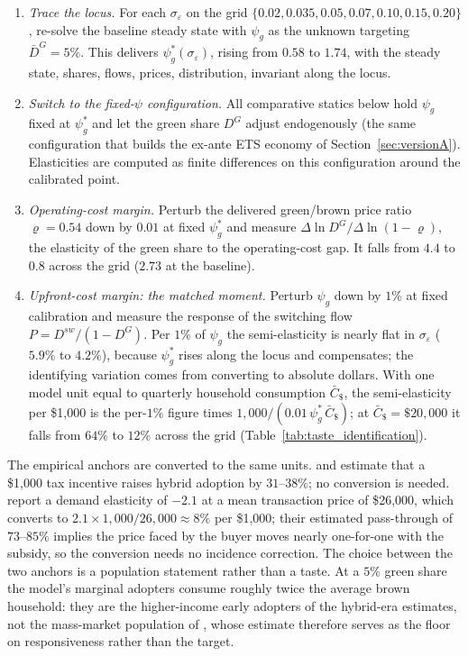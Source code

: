 \begin{enumerate}\itemsep3pt
\item \emph{Trace the locus.} For each $\sigma_\varepsilon$ on the grid
$\{0.02, 0.035, 0.05, 0.07, 0.10, 0.15, 0.20\}$, re-solve the baseline steady
state with $\psi_g$ as the unknown targeting $\bar D^G = 5\%$. This delivers
$\psi_g^*(\sigma_\varepsilon)$, rising from $0.58$ to $1.74$, with the steady
state, shares, flows, prices, distribution, invariant along the locus.

\item \emph{Switch to the fixed-$\psi$ configuration.} All comparative statics
below hold $\psi_g$ fixed at $\psi_g^*$ and let the green share $D^G$ adjust
endogenously (the same configuration that builds the ex-ante ETS economy of
Section~\ref{sec:versionA}). Elasticities are computed as finite differences on
this configuration around the calibrated point.

\item \emph{Operating-cost margin.} Perturb the delivered green/brown price
ratio $\varrho = 0.54$ down by $0.01$ at fixed $\psi_g^*$ and measure
$\Delta \ln D^G / \Delta \ln (1-\varrho)$, the elasticity of the green share to
the operating-cost gap. It falls from $4.4$ to $0.8$ across the grid ($2.73$ at
the baseline).

\item \emph{Upfront-cost margin: the matched moment.} Perturb $\psi_g$ down by
$1\%$ at fixed calibration and measure the response of the switching flow
$P = D^{sw}/(1-D^G)$. Per $1\%$ of $\psi_g$ the semi-elasticity is nearly flat
in $\sigma_\varepsilon$ ($5.9\%$ to $4.2\%$), because $\psi_g^*$ rises along the
locus and compensates; the identifying variation comes from converting to
absolute dollars. With one model unit equal to quarterly household consumption
$\bar C_{\$}$, the semi-elasticity per \$1{,}000 is the per-$1\%$ figure times
$1{,}000/(0.01\,\psi_g^*\,\bar C_{\$})$; at $\bar C_{\$} = \$20{,}000$ it falls
from $64\%$ to $12\%$ across the grid
(Table~\ref{tab:taste_identification}).
\end{enumerate}

The empirical anchors are converted to the same units.
\citet{GallagherMuehlegger2011} and \citet{Chandra2010} estimate that a
\$1{,}000 tax incentive raises hybrid adoption by $31$--$38\%$; no conversion is
needed. \citet{MuehleggerRapson2022} report a demand elasticity of $-2.1$ at a
mean transaction price of \$26{,}000, which converts to
$2.1 \times 1{,}000/26{,}000 \approx 8\%$ per \$1{,}000; their estimated
pass-through of $73$--$85\%$ implies the price faced by the buyer moves nearly
one-for-one with the subsidy, so the conversion needs no incidence correction.
The choice between the two anchors is a population statement rather than a taste. At a
$5\%$ green share the model's marginal adopters consume roughly twice the
average brown household: they are the higher-income early adopters of the
hybrid-era estimates, not the mass-market population of
\citet{MuehleggerRapson2022}, whose estimate therefore serves as the floor on
responsiveness rather than the target.

